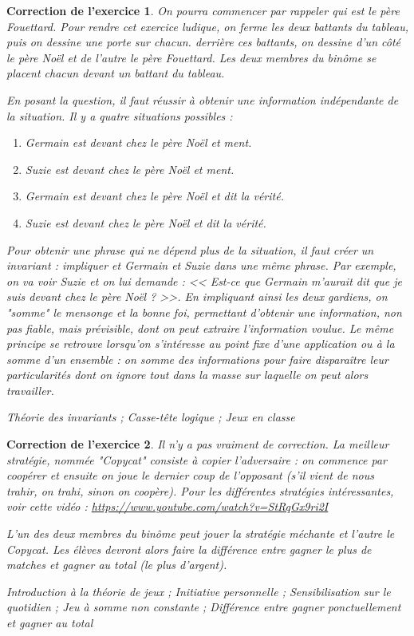 \documentclass[12pt]{article}
\theoremstyle{break}
\newtheorem{cor}{Correction de l'exercice}
\begin{document}
\begin{cor}
On pourra commencer par rappeler qui est le père Fouettard. Pour rendre cet exercice ludique, on ferme les deux battants du tableau, puis on dessine une porte sur chacun. derrière ces battants, on dessine d'un côté le père Noël et de l'autre le père Fouettard. Les deux membres du binôme se placent chacun devant un battant du tableau.

En posant la question, il faut réussir à obtenir une information indépendante de la situation. Il y a quatre situations possibles :\begin{enumerate}
\item Germain est devant chez le père Noël et ment.
\item Suzie est devant chez le père Noël et ment.
\item Germain est devant chez le père Noël et dit la vérité.
\item Suzie est devant chez le père Noël et dit la vérité.
\end{enumerate}

Pour obtenir une phrase qui ne dépend plus de la situation, il faut créer un invariant : impliquer et Germain et Suzie dans une même phrase. Par exemple, on va voir Suzie et on lui demande : << Est-ce que Germain m'aurait dit que je suis devant chez le père Noël ? >>. En impliquant ainsi les deux gardiens, on "somme" le mensonge et la bonne foi, permettant d'obtenir une information, non pas fiable, mais prévisible, dont on peut extraire l'information voulue. Le même principe se retrouve lorsqu'on s'intéresse au point fixe d'une application ou à la somme d'un ensemble : on somme des informations pour faire disparaître leur particularités dont on ignore tout dans la masse sur laquelle on peut alors travailler.

\textit{Théorie des invariants ; Casse-tête logique ; Jeux en classe}
\end{cor}


\begin{cor}
Il n'y a pas vraiment de correction. La meilleur stratégie, nommée "Copycat" consiste à copier l'adversaire : on commence par coopérer et ensuite on joue le dernier coup de l'opposant (s'il vient de nous trahir, on trahi, sinon on coopère). Pour les différentes stratégies intéressantes, voir cette vidéo : \url{https://www.youtube.com/watch?v=StRqGx9ri2I}

L'un des deux membres du binôme peut jouer la stratégie méchante et l'autre le Copycat. Les élèves devront alors faire la différence entre gagner le plus de matches et gagner au total (le plus d'argent).

\textit{Introduction à la théorie de jeux ; Initiative personnelle ; Sensibilisation sur le quotidien ; Jeu à somme non constante ; Différence entre gagner ponctuellement et gagner au total}
\end{cor}
\end{document}
